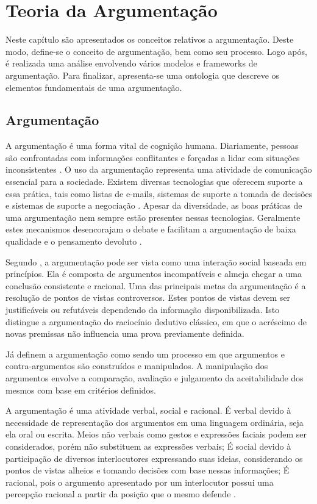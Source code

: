 \chapter{Teoria da Argumentação}

Neste capítulo são apresentados os conceitos relativos a argumentação. Deste modo, define-se o conceito de argumentação, bem como seu processo. Logo após, é realizada uma análise envolvendo vários modelos e frameworks de argumentação. Para finalizar, apresenta-se uma ontologia que descreve os elementos fundamentais de uma argumentação.

\section{Argumentação}

A argumentação é uma forma vital de cognição humana. Diariamente, pessoas são confrontadas com informações conflitantes e forçadas a lidar com situações inconsistentes \cite{besnard_elements_2008}. O uso da argumentação representa uma atividade de comunicação essencial para a sociedade. Existem diversas tecnologias que oferecem suporte a essa prática, tais como listas de e-mails, sistemas de suporte a tomada de decisões e sistemas de suporte a negociação \cite{moor2006AST}. Apesar da diversidade, as boas práticas de uma argumentação nem sempre estão presentes nessas tecnologias. Geralmente estes mecanismos desencorajam o debate e facilitam a argumentação de baixa qualidade e o pensamento devoluto \cite{bex_implementing_2013}.

Segundo , a argumentação pode ser vista como uma interação social baseada em princípios. Ela é composta de argumentos incompatíveis e almeja chegar a uma conclusão consistente e racional. Uma das principais metas da argumentação é a resolução de pontos de vistas controversos. Estes pontos de vistas devem ser justificáveis ou refutáveis dependendo da informação disponibilizada. Isto distingue a argumentação do raciocínio dedutivo clássico, em que o acréscimo de novas premissas não influencia uma prova previamente definida. 

Já  definem a argumentação como sendo um processo em que argumentos e contra-argumentos são construídos e manipulados. A manipulação dos argumentos envolve a comparação, avaliação e julgamento da aceitabilidade dos mesmos com base em critérios definidos.

A argumentação é uma atividade verbal, social e racional.  É verbal devido à necessidade de representação dos argumentos em uma linguagem ordinária, seja ela oral ou escrita. Meios não verbais como gestos e expressões faciais podem ser considerados, porém não substituem as expressões verbais; É social devido à participação de diversos interlocutores expressando suas ideias, considerando os pontos de vistas alheios e tomando decisões com base nessas informações; É racional, pois o argumento apresentado por um interlocutor possui uma percepção racional a partir da posição que o mesmo defende \cite{eemeren1996argumentation}.

